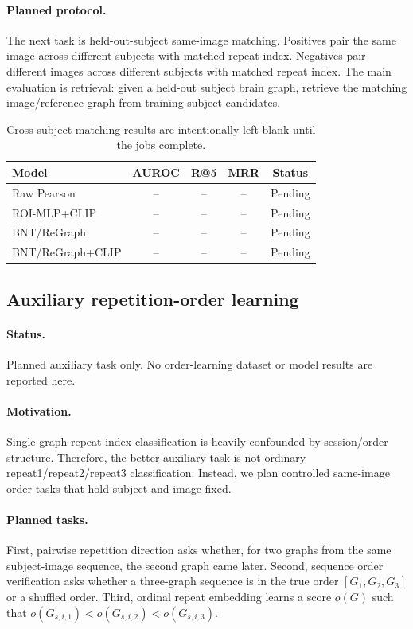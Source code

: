 \documentclass{article}
\begin{document}
\paragraph{Planned protocol.}
The next task is held-out-subject same-image matching. Positives pair the same image across different subjects with matched repeat index. Negatives pair different images across different subjects with matched repeat index. The main evaluation is retrieval: given a held-out subject brain graph, retrieve the matching image/reference graph from training-subject candidates.

\begin{table}[h]
  \centering
  \caption{Cross-subject matching results are intentionally left blank until the jobs complete.}
  \small
  \begin{tabular}{lcccc}
    \toprule
    Model & AUROC & R@5 & MRR & Status \\
    \midrule
    Raw Pearson & -- & -- & -- & Pending \\
    ROI-MLP+CLIP & -- & -- & -- & Pending \\
    BNT/ReGraph & -- & -- & -- & Pending \\
    BNT/ReGraph+CLIP & -- & -- & -- & Pending \\
    \bottomrule
  \end{tabular}
\end{table}

\subsection{Auxiliary repetition-order learning}

\paragraph{Status.}
Planned auxiliary task only. No order-learning dataset or model results are reported here.

\paragraph{Motivation.}
Single-graph repeat-index classification is heavily confounded by session/order structure. Therefore, the better auxiliary task is not ordinary repeat1/repeat2/repeat3 classification. Instead, we plan controlled same-image order tasks that hold subject and image fixed.

\paragraph{Planned tasks.}
First, pairwise repetition direction asks whether, for two graphs from the same subject-image sequence, the second graph came later. Second, sequence order verification asks whether a three-graph sequence is in the true order $[G_1,G_2,G_3]$ or a shuffled order. Third, ordinal repeat embedding learns a score $o(G)$ such that $o(G_{s,i,1}) < o(G_{s,i,2}) < o(G_{s,i,3})$.
\end{document}

